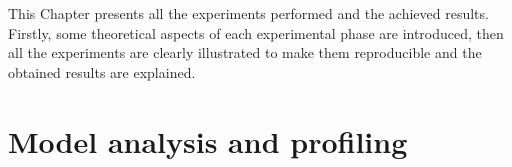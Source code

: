 This Chapter presents all the experiments performed and the achieved results.
Firstly, some theoretical aspects of each experimental phase are introduced, then all the experiments are clearly illustrated to make them reproducible and the obtained results are explained.

\section{Model analysis and profiling}
\label{sec:model-analysis}


